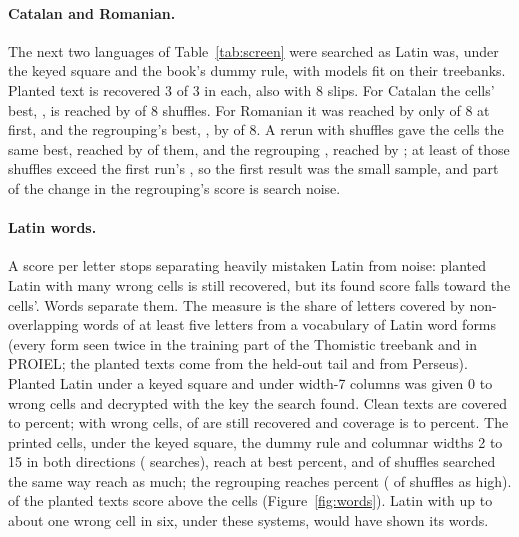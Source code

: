 \documentclass[11pt]{article}
\theoremstyle{definition}
\begin{document}
\paragraph{Catalan and Romanian.} The next two languages of Table~\ref{tab:screen} were searched as Latin was, under the keyed square and the book's dummy rule, with models fit on their treebanks. Planted text is recovered 3 of 3 in each, also with 8 slips. For Catalan the cells' best, \caCells{}, is reached by \caCellsHigh{} of 8 shuffles. For Romanian it was reached by only \roCellsHigh{} of 8 at first, and the regrouping's best, \roRegroupedFirst{}, by \roRegroupedFirstHigh{} of 8. A rerun with \roWideShuffles{} shuffles gave the cells the same best, reached by \roWideHigh{} of them, and the regrouping \roRegroupedRerun{}, reached by \roWideRegroupedHigh{}; at least \roRegroupedRerunAbove{} of those shuffles exceed the first run's \roRegroupedFirst{}, so the first result was the small sample, and part of the change in the regrouping's score is search noise.

\paragraph{Latin words.} A score per letter stops separating heavily mistaken Latin from noise: planted Latin with many wrong cells is still recovered, but its found score falls toward the cells'. Words separate them. The measure is the share of letters covered by non-overlapping words of at least five letters from a vocabulary of \lwdVocab{} Latin word forms (every form seen twice in the training part of the Thomistic treebank and in PROIEL; the planted texts come from the held-out tail and from Perseus). Planted Latin under a keyed square and under width-7 columns was given 0 to \lwdErrMax{} wrong cells and decrypted with the key the search found. Clean texts are covered \lwdCleanLow{} to \lwdCleanHigh{} percent; with \lwdErrMax{} wrong cells, \lwdWorstRecovered{} of \lwdWorstPlanted{} are still recovered and coverage is \lwdWorstLow{} to \lwdWorstHigh{} percent. The printed cells, under the keyed square, the dummy rule and columnar widths 2 to 15 in both directions (\lwdSearches{} searches), reach at best \lwdCellsBest{} percent, and \lwdCellsAsHigh{} of \lwdShuffles{} shuffles searched the same way reach as much; the regrouping reaches \lwdRegroupedBest{} percent (\lwdRegroupedAsHigh{} of \lwdShuffles{} shuffles as high). \lwdAbove{} of the \lwdPlanted{} planted texts score above the cells (Figure~\ref{fig:words}). Latin with up to about one wrong cell in six, under these systems, would have shown its words.
\end{document}
